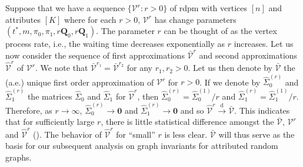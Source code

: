 \documentclass[10pt,journal,compsoc]{IEEEtran}
\theoremstyle{definition}
\begin{document}
Suppose that we have a sequence $\{\mathscr{V}^{r} \colon r > 0 \}$ of
rdpm with vertices $[n]$ and attributes $[K]$ where for each $r > 0$,
$\mathscr{V}^{r}$ has change parameters $(t^{*}, m, \pi_0, \pi_1, r
\mathbf{Q}_0, r \mathbf{Q}_1)$. The parameter $r$ can be thought of as
the vertex process rate, i.e., the waiting time decreases
exponentially as $r$ increases. Let us now consider the sequence of
first approximations $\bar{\mathscr{V}}^{r}$ and second approximations
$\widehat{\mathscr{V}}^{r}$ of $\mathscr{V}^{r}$. We note that
$\bar{\mathscr{V}}^{r_1} = \bar{\mathscr{V}}^{r_2}$ for any $r_1, r_2
> 0$. Let us then denote by $\bar{\mathscr{V}}$ the (a.e.) unique
first order approximation of $\mathscr{V}^{r}$ for $r > 0$. If we
denote by $\widehat{\Sigma}_{0}^{(r)}$ and
$\widehat{\Sigma}_{1}^{(r)}$ the matrices $\widehat{\Sigma}_0$ and
$\widehat{\Sigma}_1$ for $\widehat{\mathscr{V}}^{r}$, then
$\widehat{\Sigma}_0^{(r)} = \widehat{\Sigma}_0^{(1)}/r$ and
$\widehat{\Sigma}_{1}^{(r)} = \widehat{\Sigma}_1^{(1)}/r$. Therefore,
as $r \rightarrow \infty$, $\widehat{\Sigma}_0^{(r)} \rightarrow
\bm{0}$ and $\widehat{\Sigma}_1^{(r)} \rightarrow \bm{0}$ and so
$\widehat{\mathscr{V}}^{r} \overset{\mathrm{d}}{\longrightarrow}
\bar{\mathscr{V}}$. This indicates that for sufficiently large $r$,
there is little statistical difference amongst the
$\bar{\mathscr{V}}$, $\mathscr{V}^{r}$ and $\widehat{\mathscr{V}}^{r}$
(\cite[Theorem 2]{lee11}). The behavior of
$\widehat{\mathscr{V}}^{r}$ for ``small'' $r$ is less
clear. $\bar{\mathscr{V}}$ will thus serve as the basis for our
subsequent analysis on graph invariants for attributed random graphs.
\end{document}
